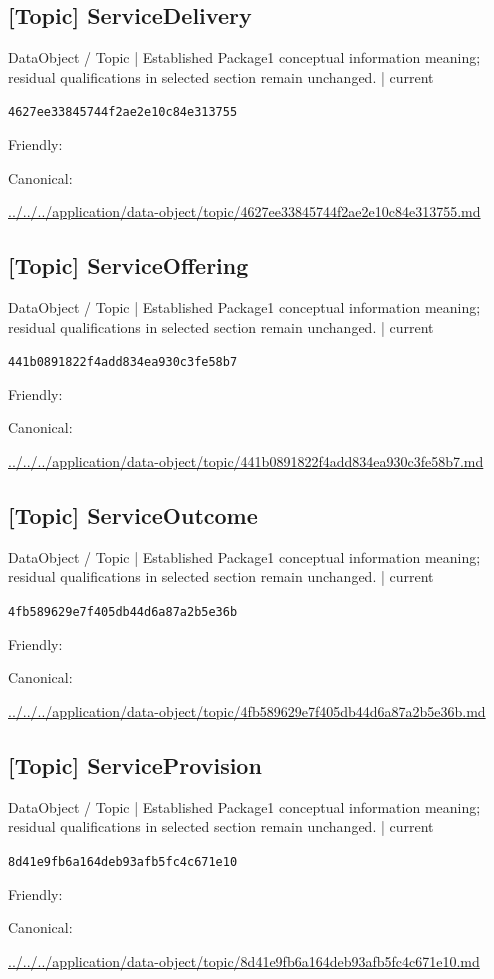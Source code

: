 \documentclass[10pt,a4paper]{article}
\begin{document}
\subsection*{[Topic] ServiceDelivery}
{\small DataObject / Topic | Established Package1 conceptual information meaning; residual qualifications in selected section remain unchanged. | current}\par
\texttt{4627ee33845744f2ae2e10c84e313755}\par
Friendly: \par
Canonical: \par
{\footnotesize\url{../../../application/data-object/topic/4627ee33845744f2ae2e10c84e313755.md}}\par
\subsection*{[Topic] ServiceOffering}
{\small DataObject / Topic | Established Package1 conceptual information meaning; residual qualifications in selected section remain unchanged. | current}\par
\texttt{441b0891822f4add834ea930c3fe58b7}\par
Friendly: \par
Canonical: \par
{\footnotesize\url{../../../application/data-object/topic/441b0891822f4add834ea930c3fe58b7.md}}\par
\subsection*{[Topic] ServiceOutcome}
{\small DataObject / Topic | Established Package1 conceptual information meaning; residual qualifications in selected section remain unchanged. | current}\par
\texttt{4fb589629e7f405db44d6a87a2b5e36b}\par
Friendly: \par
Canonical: \par
{\footnotesize\url{../../../application/data-object/topic/4fb589629e7f405db44d6a87a2b5e36b.md}}\par
\subsection*{[Topic] ServiceProvision}
{\small DataObject / Topic | Established Package1 conceptual information meaning; residual qualifications in selected section remain unchanged. | current}\par
\texttt{8d41e9fb6a164deb93afb5fc4c671e10}\par
Friendly: \par
Canonical: \par
{\footnotesize\url{../../../application/data-object/topic/8d41e9fb6a164deb93afb5fc4c671e10.md}}\par
\end{document}
